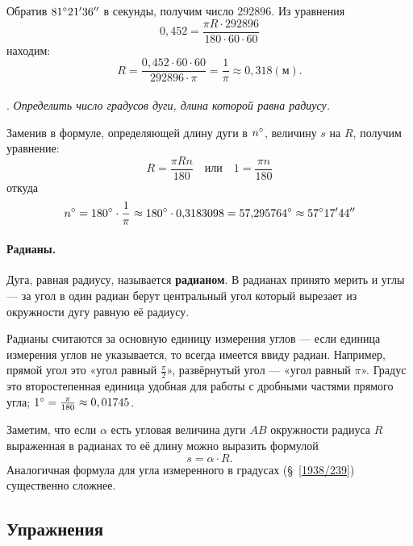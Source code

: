 Обратив $81\degree 21'36''$ в секунды, получим число 292896.
Из уравнения
\[0{,}452 = \frac{\pi R\cdot  292896}{180\cdot 60\cdot 60}\]
находим:
\[R=\frac{0{,}452\cdot 60\cdot 60}{292896\cdot \pi}=\frac1\pi\approx0{,}318 (\text{м}).\]

\paragraph{}\label{1938/241}
.
\emph{Определить число градусов дуги, длина которой равна радиусу.}

Заменив в формуле, определяющей длину дуги в $n\degree$, величину $s$ на $R$, получим уравнение:
\[R=\frac{\pi R n}{180}
\quad\text{или}\quad
1=\frac{\pi n}{180}\]
откуда
\[n\degree = 180\degree \cdot \frac1\pi \approx 180\degree \cdot 0{,}3183098 = 57{,}295764\degree \approx 57\degree17'44''\]

\paragraph{Радианы.}\label{extra/radians}
Дуга, равная радиусу, называется \textbf{радианом}.
В радианах принято мерить и углы — за угол в один радиан берут центральный угол который вырезает из окружности дугу равную её радиусу.

Радианы считаются за основную единицу измерения углов --- если единица измерения углов не указывается, то всегда имеется ввиду радиан.
Например, прямой угол это «угол равный $\tfrac\pi2$», развёрнутый угол --- «угол равный $\pi$».
Градус это второстепенная единица удобная для работы с дробными частями прямого угла;
$1\degree =\tfrac\pi{180}\approx 0{,01745}$.

Заметим, что если $\alpha$ есть угловая величина дуги $AB$ окружности радиуса $R$ выраженная в радианах то её длину можно выразить формулой
\[s=\alpha\cdot R.\]
Аналогичная формула для угла измеренного в градусах (§~\ref{1938/239}) существенно сложнее.

\subsection*{Упражнения}

